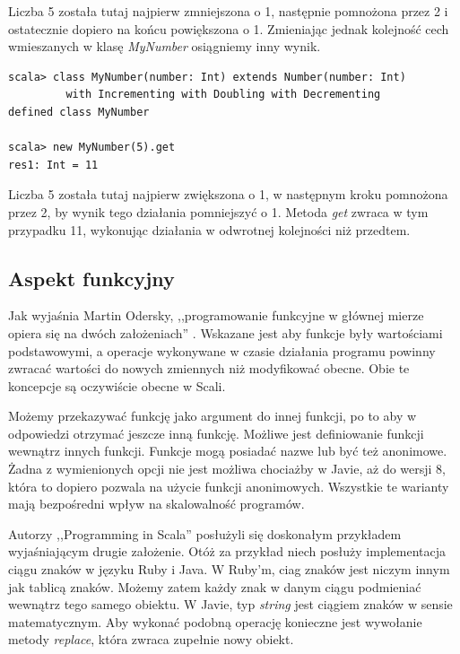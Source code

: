\documentclass[brudnopis]{xmgr}
\begin{document}
Liczba 5 została tutaj najpierw zmniejszona o 1, następnie pomnożona przez 2 i ostatecznie dopiero na końcu powiększona o 1. Zmieniając jednak kolejność cech wmieszanych w klasę \emph{MyNumber} osiągniemy inny wynik.

\begin{verbatim}
scala> class MyNumber(number: Int) extends Number(number: Int) 
         with Incrementing with Doubling with Decrementing
defined class MyNumber

scala> new MyNumber(5).get
res1: Int = 11
\end{verbatim}

Liczba 5 została tutaj najpierw zwiększona o 1, w następnym kroku pomnożona przez 2, by wynik tego działania pomniejszyć o 1. Metoda \emph{get} zwraca w tym przypadku 11, wykonując działania w odwrotnej kolejności niż przedtem.

\subsection{Aspekt funkcyjny}

Jak wyjaśnia Martin Odersky, ,,programowanie funkcyjne w głównej mierze opiera się na dwóch założeniach'' \cite[s.57]{Odersky:2010:PIS}. Wskazane jest aby funkcje były wartościami podstawowymi, a operacje wykonywane w czasie działania programu powinny zwracać wartości do nowych zmiennych niż modyfikować obecne. Obie te koncepcje są oczywiście obecne w Scali. 

Możemy przekazywać funkcję jako argument do innej funkcji, po to aby w odpowiedzi otrzymać jeszcze inną funkcję. Możliwe jest definiowanie funkcji wewnątrz innych funkcji. Funkcje mogą posiadać nazwe lub być też anonimowe. Żadna z wymienionych opcji nie jest możliwa chociażby w Javie, aż do wersji 8, która to dopiero pozwala na użycie funkcji anonimowych. Wszystkie te warianty mają bezpośredni wpływ na skalowalność programów.

Autorzy ,,Programming in Scala'' posłużyli się doskonałym przykładem wyjaśniającym drugie założenie. \cite[s.57]{Odersky:2010:PIS} Otóż za przykład niech posłuży implementacja ciągu znaków w języku Ruby i Java. W Ruby'm, ciag znaków jest niczym innym jak tablicą znaków. Możemy zatem każdy znak w danym ciągu podmieniać wewnątrz tego samego obiektu. W Javie, typ \emph{string} jest ciągiem znaków w sensie matematycznym. Aby wykonać podobną operację konieczne jest wywołanie metody \emph{replace}, która zwraca zupełnie nowy obiekt.
\end{document}
